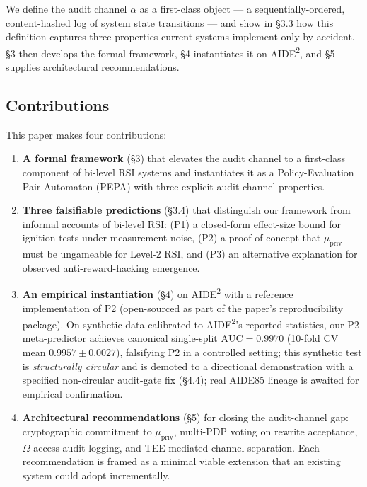 \documentclass{article}
\theoremstyle{definition}
\begin{document}
We define the audit channel $\alpha$ as a first-class object --- a sequentially-ordered, content-hashed log of system state transitions --- and show in \S3.3 how this definition captures three properties current systems implement only by accident. \S3 then develops the formal framework, \S4 instantiates it on AIDE\textsuperscript{2}, and \S5 supplies architectural recommendations.

\subsection{Contributions}

This paper makes four contributions:

\begin{enumerate}
    \item \textbf{A formal framework} (\S3) that elevates the audit channel to a first-class component of bi-level RSI systems and instantiates it as a Policy-Evaluation Pair Automaton (PEPA) with three explicit audit-channel properties.
    \item \textbf{Three falsifiable predictions} (\S3.4) that distinguish our framework from informal accounts of bi-level RSI: (P1) a closed-form effect-size bound for ignition tests under measurement noise, (P2) a proof-of-concept that $\mu_{\text{priv}}$ must be ungameable for Level-2 RSI, and (P3) an alternative explanation for observed anti-reward-hacking emergence.
    \item \textbf{An empirical instantiation} (\S4) on AIDE\textsuperscript{2} with a reference implementation of P2 (open-sourced as part of the paper's reproducibility package). On synthetic data calibrated to AIDE\textsuperscript{2}'s reported statistics, our P2 meta-predictor achieves canonical single-split $\text{AUC} = 0.9970$ (10-fold CV mean $0.9957\pm0.0027$), falsifying P2 in a controlled setting; this synthetic test is \emph{structurally circular} and is demoted to a directional demonstration with a specified non-circular audit-gate fix (\S4.4); real AIDE85 lineage is awaited for empirical confirmation.
    \item \textbf{Architectural recommendations} (\S5) for closing the audit-channel gap: cryptographic commitment to $\mu_{\text{priv}}$, multi-PDP voting on rewrite acceptance, $\Omega$ access-audit logging, and TEE-mediated channel separation. Each recommendation is framed as a minimal viable extension that an existing system could adopt incrementally.
\end{enumerate}
\end{document}

